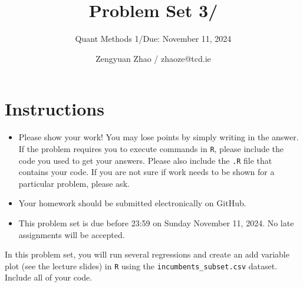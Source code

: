 \documentclass[12pt,letterpaper]{article}
\title{Problem Set 3/}
\date{Zengyuan Zhao / zhaoze@tcd.ie}
\author{Quant Methods 1/Due: November 11, 2024}
\begin{document}
	\maketitle
	\section*{Instructions}
	\begin{itemize}
		\item Please show your work! You may lose points by simply writing in the answer. If the problem requires you to execute commands in \texttt{R}, please include the code you used to get your answers. Please also include the \texttt{.R} file that contains your code. If you are not sure if work needs to be shown for a particular problem, please ask.
	\item Your homework should be submitted electronically on GitHub.
	\item This problem set is due before 23:59 on Sunday November 11, 2024. No late assignments will be accepted.

	\end{itemize}

		\vspace{.25cm}
	
\noindent In this problem set, you will run several regressions and create an add variable plot (see the lecture slides) in \texttt{R} using the \texttt{incumbents\_subset.csv} dataset. Include all of your code.

	\vspace{.5cm}
\end{document}
